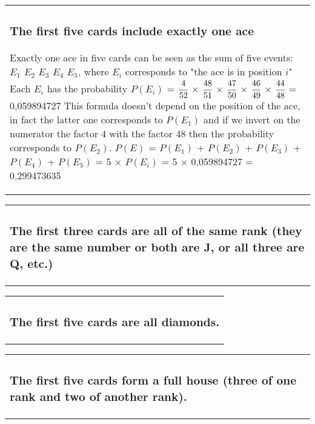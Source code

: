 \documentclass[oneside]{article}			%
\newenvironment{adjustwidth}{\begin{center}\begin{tabular}{p{0.9\textwidth}}		%

    }
    { 
    \end{tabular} 
    \end{center}
    }
\begin{document}
	\begin{adjustwidth}
	\subsubsection{The first five cards include exactly one ace} 
	Exactly one ace in five cards can be seen as the sum of five events: $E_1$ $E_2$ $E_3$ $E_4$ $E_5$, where $E_i$ corresponds to "the ace is in position $i$"
	\newline Each $E_i$ has the probability $P(E_i)$ = $\cfrac{4}{52}$ $\times$ $\cfrac{48}{51}$ $\times$ $\cfrac{47}{50}$ $\times$ $\cfrac{46}{49}$ $\times$ $\cfrac{44}{48}$ = 0,059894727
	\newline This formula doesn't depend on the position of the ace, in fact the latter one corresponds to $P(E_1)$ and if we invert on the numerator the factor 4 with the factor 48 then the probability corresponds to $P(E_2)$.
	\newline $P(E)$ = $P(E_1)$ + $P(E_2)$ + $P(E_3)$ + $P(E_4)$ + $P(E_5)$ = 5 $\times$ $P(E_i)$ = 5 $\times$ 0,059894727 = 0,299473635

	\end{adjustwidth}

	\begin{adjustwidth}
	\subsubsection{The first three cards are all of the same rank (they are the same number or both are J, or all three are Q, etc.)} 
	\lipsum[3]		%
	\end{adjustwidth}
	
	\begin{adjustwidth}
	\subsubsection{The first five cards are all diamonds.} 
	\lipsum[4]		%
	\end{adjustwidth}
	
	\begin{adjustwidth}
	\subsubsection{The first five cards form a full house (three of one rank and two of another rank).} 
	\lipsum[5]		%
	\end{adjustwidth}
\end{document}
